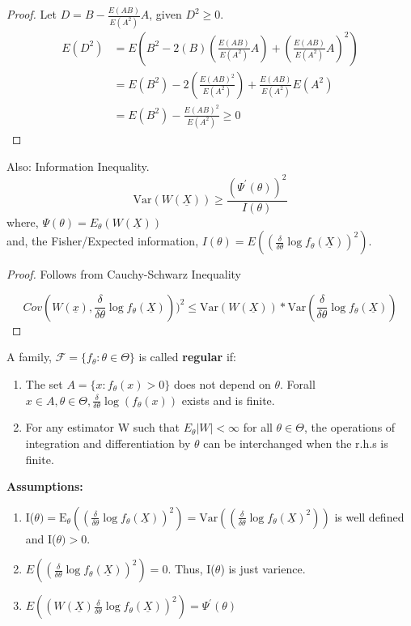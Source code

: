 \documentclass[11pt,fleqn]{book} %
\begin{document}
	\begin{proof}
	Let $D = B - \frac{E(AB)}{E(A^2)}A$, given $D^2 \ge 0$.
		\begin{align*}
			E(D^2) &= E(B^2 - 2(B)(\frac{E(AB)}{E(A^2)}A)+(\frac{E(AB)}{E(A^2)}A)^2)\\
				&= E(B^2)-2\left( \frac{E(AB)^2}{E(A^2)} \right) + \frac{E(AB)}{E(A^2)}E(A^2)\\
				&= E(B^2) - \frac{E(AB)^2}{E(A^2)} \ge 0
		\end{align*}	
	\end{proof}

	\begin{theorem}
		Also: Information Inequality. 
		$$\text{Var}(W(\underline{X})) \ge \frac{(\Psi^\prime(\theta))^2}{I(\theta)}$$
		where, 
		$\Psi(\theta)=E_\theta(W(\underline{X}))$\\
		and, 
		the Fisher/Expected information, $I(\theta)=E\left((\frac{\delta}{\delta \theta}\log f_\theta(\underline{X}))^2 \right)$.

		
	\end{theorem}

	\begin{proof}
		Follows from Cauchy-Schwarz Inequality 

		$$Cov(W(\underline{x}), \frac{\delta}{\delta\theta}\log f_\theta(\underline{X})))^2 \le \text{Var}(W(\underline{X}))*\text{Var}(\frac{\delta}{\delta\theta}\log f_\theta(\underline{X})) $$

	\end{proof}

	\begin{definition}[Regular]
		A family, $\mathcal{F} = \{f_\theta:\theta \in \Theta\}$ is called \textbf{regular} if:
		\begin{enumerate}[label = (\Roman*)]
			\item The set $A = \{x: f_\theta (x) > 0\}$ does not depend on $\theta$.  Forall $x\in A, \theta \in \Theta, \frac{\delta}{\delta\theta} \log(f_\theta(x))$ exists and is finite.
			\item For any estimator W such that $E_\theta|W| < \infty$ for all $\theta \in \Theta$, the operations of integration and differentiation by $\theta$ can be interchanged when the r.h.s is finite.
		\end{enumerate}
	\end{definition}

	\textbf{Assumptions:}
	\begin{enumerate}
		\item I($\theta)=\text{E}_\theta \left((\frac{\delta}{\delta \theta}\log f_\theta(\underline{X}))^2\right) = \text{Var}\left((\frac{\delta}{\delta \theta}\log f_\theta(\underline{X})^2)\right)$ is well defined and I($\theta)>0$.
		\item $E \left((\frac{\delta}{\delta \theta}\log f_\theta(\underline{X}))^2 \right)=0$. Thus, I($\theta$) is just varience.
		\item $E \left((W(\underline{X})\frac{\delta}{\delta \theta}\log f_\theta(\underline{X}))^2 \right)=\Psi^\prime(\theta)$
	\end{enumerate}
\end{document}
